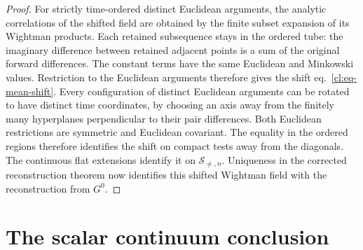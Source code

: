 \documentclass[11pt,letterpaper,reqno]{amsart}
\numberwithin{equation}{section}
\renewcommand{\eqref}[1]{\textup{eq.~\ref{#1}}}
\theoremstyle{definition}
\theoremstyle{remark}
\begin{document}
\begin{proof}
For strictly time-ordered distinct Euclidean arguments,
the analytic correlations of the shifted field are obtained
by the finite subset expansion of its Wightman products.
Each retained subsequence stays in the ordered tube:
the imaginary difference between retained adjacent points
is a sum of the original forward differences. The constant
terms have the same Euclidean and Minkowski values.
Restriction to the Euclidean arguments therefore gives the
shift \eqref{cl:eq-mean-shift}. Every configuration of
distinct Euclidean arguments can be rotated to have distinct
time coordinates, by choosing an axis away from the finitely
many hyperplanes perpendicular to their pair differences.
Both Euclidean restrictions are symmetric and Euclidean
covariant. The equality in the ordered regions therefore
identifies the shift on compact tests away from the diagonals.
The continuous flat extensions identify it on \(\mathcal S_{\ne,n}\).
Uniqueness in the corrected reconstruction theorem now
identifies this shifted Wightman field with the reconstruction
from \(G^0\).
\end{proof}


\clearpage
\section{The scalar continuum conclusion}
\label{cl:sec-conclusion}
\end{document}
